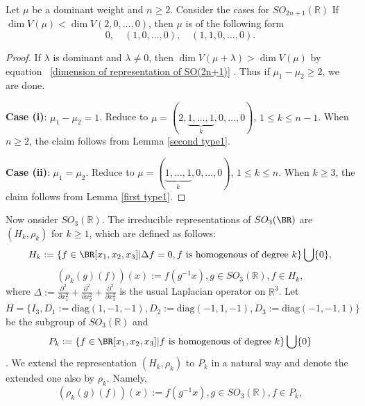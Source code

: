 \documentclass[a4paper]{amsart}
\newcommand{\diag}{{\mathrm{diag}}}
\theoremstyle{plain}
\theoremstyle{remark} \newtheorem{remark}[thm]{Remark}
\theoremstyle{remark} \newtheorem{exercise}{Exercise}
\theoremstyle{remark} \newtheorem{example}{Example}
\numberwithin{equation}{section}
\begin{document}
\begin{prop}\label{type2-condition}
	Let $\mu$ be a dominant weight and $n\geq 2$. Consider the cases for $SO_{2n+1}(\mathbb{R})$ If $\dim V(\mu)<\dim V(2,0,\ldots,0)$, then $\mu$ is of the following form
	\[0,\quad (1,0,\ldots,0),\quad (1,1,0,\ldots,0).\]
\end{prop}
\begin{proof}
	If $\lambda$ is dominant and $\lambda\neq 0$, then $\dim V(\mu+\lambda)>\dim V(\mu)$ by equation ~\eqref{dimension of representation of SO(2n+1)} . Thus if $\mu_1-\mu_2\geqslant 2$, we are done. 
	
	\textbf{Case (i)}: $\mu_1-\mu_2=1$. Reduce to $\mu=(2,\underbrace{1,\ldots,1}_k,0,\ldots,0)$, $1\leqslant k\leqslant n-1$. When $n\geqslant 2$, the claim follows from Lemma \ref{second type1}. 
	
	\textbf{Case (ii)}: $\mu_1=\mu_2$. Reduce to $\mu=(\underbrace{1,\ldots,1}_k,0,\ldots,0)$, $1\leqslant k\leqslant n$. When $k\geqslant 3$, the claim follows from Lemma \ref{first type1}.
\end{proof}

Now onsider $SO_3(\mathbb{R})$. The irreducible representations of $SO_3(\BR)$ are $(H_k,\rho_k)$ for $k\geq 1$, which are defined as follows: 
\[
H_k:=\{f\in \BR[x_1,x_2,x_3]|\Delta f=0, f \text{ is homogenous of degree }k\}\bigcup \{0\},
\]
\[
(\rho_k(g)(f))(x):=f(g^{-1}x), g\in SO_3(\mathbb{R}), f\in H_k,
\]
where $\Delta:=\frac{\partial^2 }{\partial x_1^2 }+\frac{\partial^2 }{\partial x_2^2 }+\frac{\partial^2 }{\partial x_3^2 }$ is the usual Laplacian operator on $\mathbb{R}^3$. %
Let $H=\{I_3,D_1:=\diag(1,-1,-1),D_2:=\diag(-1,1,-1),D_3:=\diag(-1,-1,1)\}$ be the subgroup of $SO_3(\mathbb{R})$ and $$P_k:=\{f\in \BR[x_1,x_2,x_3]| f \text{ is homogenous of degree }k\}\bigcup\{0\}$$. We extend the representation $(H_k,\rho_k)$ to $P_k$ in a natural way and denote the extended one also by $\rho_k$. Namely, 
\[
(\rho_k(g)(f))(x):=f(g^{-1}x), g\in SO_3(\mathbb{R}), f\in P_k,
\]
\end{document}
